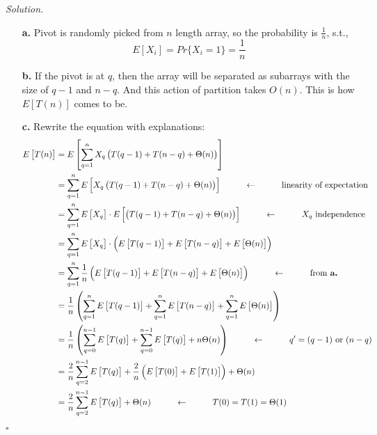 \documentclass[11pt]{article}
\theoremstyle{definition}
\newenvironment{solution}{\noindent\emph{Solution.}}{\hfill$\square$}
\newcommand\tab[1][1cm]{\hspace*{#1}}
\begin{document}
\begin{solution}
\begin{enumerate}
   \item[\textbf{a.}]
   Pivot is randomly picked from $n$ length array, so the probability is $\frac{1}{n}$, s.t.,
   $$
   E \left[  X_i \right] = Pr \{ X_i = 1  \} = \frac{1}{n}
   $$
   
      \item[\textbf{b.}]
If the pivot is at $q$, then the array will be separated as subarrays with the size of $q-1$ and $n-q$. And this action of partition takes $O(n)$. This is how $ E \left[  T(n) \right]$ comes to be.

     \item[\textbf{c.}]
     Rewrite the equation with explanations:
     \begin{align*}
     E \left[  T(n) \right] &=  E \left[    \sum_{q=1}^n X_q \left(  T(q-1) + T(n-q) + \Theta(n)    \right)  \right] \\
     &=    \sum_{q=1}^n E \left[   X_q \left(  T(q-1) + T(n-q) + \Theta(n) \right) \right] \tab\leftarrow\tab \mbox{linearity of expectation}\\
     &=   \sum_{q=1}^n E \left[   X_q \right] \cdot E \left[  \left(  T(q-1) + T(n-q) + \Theta(n) \right) \right] \tab\leftarrow\tab \mbox{$X_q$ independence}   \\
     &=     \sum_{q=1}^n E \left[   X_q \right] \cdot \left(  E  \left[   T(q-1)\right] + E \left[ T(n-q) \right] + E \left[ \Theta(n) \right]   \right)  \\
          &=  \sum_{q=1}^n \frac{1}{n}  \left(  E  \left[   T(q-1)\right] + E \left[ T(n-q) \right] + E \left[ \Theta(n) \right]   \right) \tab\leftarrow\tab \mbox{from \textbf{a.}}  \\    
     &=  \frac{1}{n} \left( \sum_{q=1}^n     E  \left[   T(q-1)\right] + \sum_{q=1}^n E \left[ T(n-q) \right] + \sum_{q=1}^n E \left[ \Theta(n) \right]   \right)         \\
     &=  \frac{1}{n} \left( \sum_{q=0}^{n-1}     E  \left[   T(q)\right] + \sum_{q=0}^{n-1} E \left[ T(q) \right] + n  \Theta(n)   \right)  \tab\leftarrow\tab q' =(q-1)\ \mbox{or} \ (n - q) \\
     &=  \frac{2}{n} \sum_{q=2}^{n-1}     E  \left[   T(q)\right] +\frac{2}{n} \left( E  \left[   T(0)\right] +E  \left[   T(1)\right] \right)   + \Theta(n)  \\
  &=   \frac{2}{n} \sum_{q=2}^{n-1}     E  \left[   T(q)\right]  + \Theta(n)  \tab\leftarrow\tab T(0)=T(1)=\Theta(1) 
     \end{align*}


\end{enumerate}
\end{solution}
\end{document}
